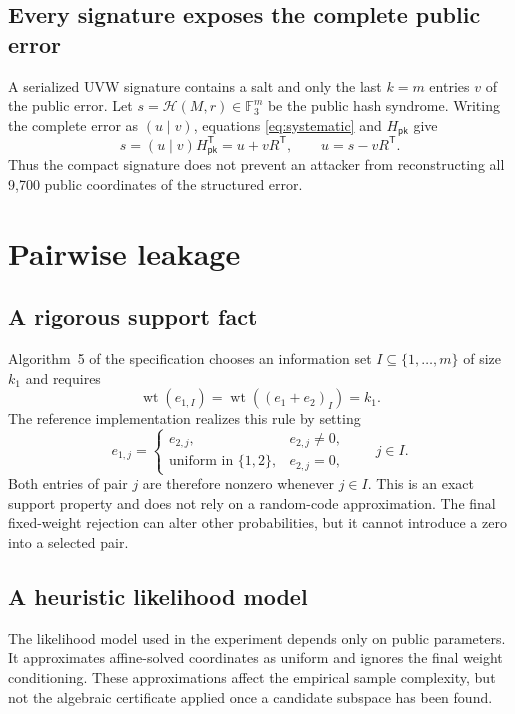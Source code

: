\documentclass[11pt,a4paper]{article}
\newcommand{\F}{\mathbb{F}}
\newcommand{\wt}{\operatorname{wt}}
\newcommand{\pk}{\mathsf{pk}}
\begin{document}
\subsection{Every signature exposes the complete public error}

A serialized UVW signature contains a salt and only the last $k=m$ entries
$v$ of the public error.  Let $s=\mathcal H(M,r)\in\F_3^m$ be the public hash
syndrome.  Writing the complete error as $(u\mid v)$, equations
\eqref{eq:systematic} and $H_{\pk}$ give
\begin{equation}
             s=(u\mid v)H_{\pk}^{\mathsf T}
              =u+vR^{\mathsf T},
 \qquad
             u=s-vR^{\mathsf T}.
 \label{eq:reconstruct}
\end{equation}
Thus the compact signature does not prevent an attacker from reconstructing
all 9,700 public coordinates of the structured error.

\section{Pairwise leakage}

\subsection{A rigorous support fact}

Algorithm~5 of the specification chooses an information set
$I\subseteq\{1,\ldots,m\}$ of size $k_1$ and requires
\[
        \wt(e_{1,I})=\wt((e_1+e_2)_I)=k_1.
\]
The reference implementation realizes this rule by setting
\begin{equation}
 e_{1,j}=
 \begin{cases}
   e_{2,j},&e_{2,j}\ne0,\\
   \text{uniform in }\{1,2\},&e_{2,j}=0,
 \end{cases}
 \qquad j\in I.
 \label{eq:forced}
\end{equation}
Both entries of pair $j$ are therefore nonzero whenever $j\in I$.  This is
an exact support property and does not rely on a random-code approximation.
The final fixed-weight rejection can alter other probabilities, but it cannot
introduce a zero into a selected pair.

\subsection{A heuristic likelihood model}

The likelihood model used in the experiment depends only on public
parameters.  It approximates affine-solved coordinates as uniform and ignores
the final weight conditioning.  These approximations affect the empirical
sample complexity, but not the algebraic certificate applied once a candidate
subspace has been found.
\end{document}
